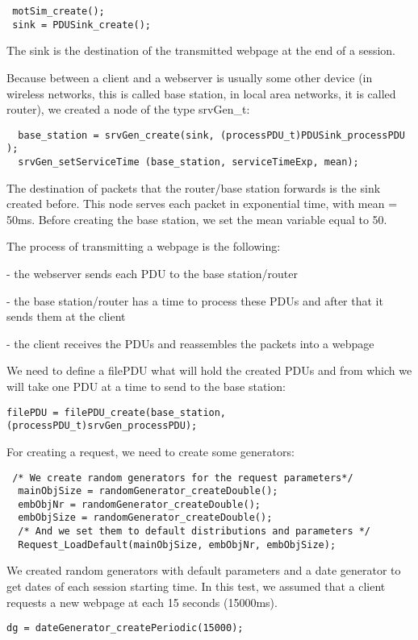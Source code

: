 \begin{verbatim}
 motSim_create();
 sink = PDUSink_create();
\end{verbatim}
The sink is the destination of the transmitted webpage at the end of a session.

Because between a client and a webserver is usually some other device (in wireless networks, this is called base station, 
in local area networks, it is called router), we created a node of the type srvGen\_t:
\begin{verbatim}
  base_station = srvGen_create(sink, (processPDU_t)PDUSink_processPDU );
  srvGen_setServiceTime (base_station, serviceTimeExp, mean);
\end{verbatim}
 The destination of packets that the router/base station forwards is the sink created before.
 This node serves each packet in exponential time, with mean = 50ms. Before creating the base station, we set the mean variable equal to 50.
 
The process of transmitting a webpage is the following:
\begin{description}
 \item - the webserver sends each PDU to the base station/router
 \item - the base station/router has a time to process these PDUs and after that it sends them at the client
 \item - the client receives the PDUs and reassembles the packets into a webpage
\end{description}

 We need to define a filePDU what will hold the created PDUs and from which we will take one PDU at a time to send to the base station:
\begin{verbatim}
filePDU = filePDU_create(base_station, (processPDU_t)srvGen_processPDU);
\end{verbatim}
 
 For creating a request, we need to create some generators:
\begin{verbatim}
 /* We create random generators for the request parameters*/
  mainObjSize = randomGenerator_createDouble();
  embObjNr = randomGenerator_createDouble();
  embObjSize = randomGenerator_createDouble();
  /* And we set them to default distributions and parameters */
  Request_LoadDefault(mainObjSize, embObjNr, embObjSize);
\end{verbatim}
 We created random generators with default parameters and a date generator to get dates of each session starting time. In this test, we assumed
that a client requests a new webpage at each 15 seconds (15000ms).
\begin{verbatim}
dg = dateGenerator_createPeriodic(15000);
\end{verbatim}

